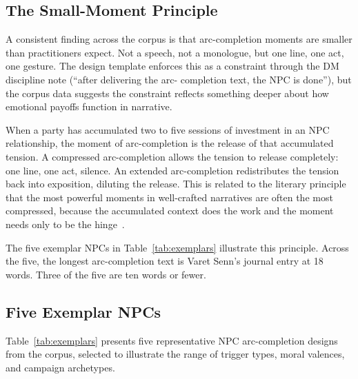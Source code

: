 \subsection{The Small-Moment Principle}

A consistent finding across the corpus is that arc-completion moments are
smaller than practitioners expect. Not a speech, not a monologue, but one
line, one act, one gesture. The design template enforces this as a
constraint through the DM discipline note (``after delivering the arc-
completion text, the NPC is done''), but the corpus data suggests the
constraint reflects something deeper about how emotional payoffs function
in narrative.

When a party has accumulated two to five sessions of investment in an NPC
relationship, the moment of arc-completion is the release of that accumulated
tension. A compressed arc-completion allows the tension to release
completely: one line, one act, silence. An extended arc-completion
redistributes the tension back into exposition, diluting the release.
This is related to the literary principle that the most powerful moments
in well-crafted narratives are often the most compressed, because the
accumulated context does the work and the moment needs only to be the
hinge~\cite{chekhov1886letter}.

The five exemplar NPCs in Table~\ref{tab:exemplars} illustrate this principle.
Across the five, the longest arc-completion text is Varet Senn's journal entry
at 18 words. Three of the five are ten words or fewer.

\subsection{Five Exemplar NPCs}

Table~\ref{tab:exemplars} presents five representative NPC arc-completion
designs from the corpus, selected to illustrate the range of trigger types,
moral valences, and campaign archetypes.

